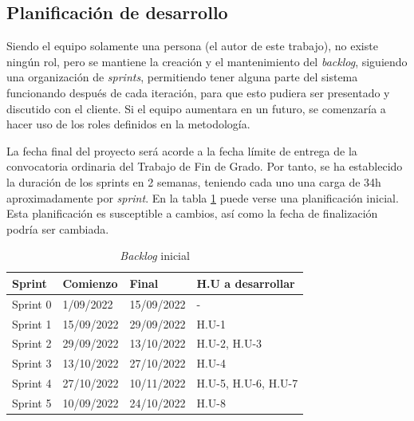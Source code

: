 \subsection{Planificación de desarrollo}
Siendo el equipo solamente una persona (el autor de este trabajo), no existe ningún rol, pero se mantiene la creación y el mantenimiento del \textit{backlog}, siguiendo una organización de \textit{sprints}, permitiendo tener alguna parte del sistema funcionando después de cada iteración, para que esto pudiera ser presentado y discutido con el cliente. Si el equipo aumentara en un futuro, se comenzaría a hacer uso de los roles definidos en la metodología.

La fecha final del proyecto será acorde a la fecha límite de entrega de la convocatoria ordinaria del Trabajo de Fin de Grado. Por tanto, se ha establecido la duración de los sprints en 2 semanas, teniendo cada uno una carga de 34h aproximadamente por \textit{sprint}. En la tabla \ref{tab:sprints} puede verse una planificación inicial. Esta planificación es susceptible a cambios, así como la fecha de finalización podría ser cambiada.


\begin{table}[!h]
	\begin{center}
		\begin{tabular}{|p{2cm}|p{3cm}|p{3cm}|p{3.8cm}|}
		\hline \textbf{Sprint} & \textbf{Comienzo} & \textbf{Final} & \textbf{H.U a desarrollar} \\ 
		\hline Sprint 0 & 1/09/2022  & 15/09/2022 & -\\ 
		\hline Sprint 1 & 15/09/2022 & 29/09/2022 & H.U-1\\ 
		\hline Sprint 2 & 29/09/2022 & 13/10/2022 & H.U-2, H.U-3\\ 
		\hline Sprint 3 & 13/10/2022 & 27/10/2022 & H.U-4\\ 
		\hline Sprint 4 & 27/10/2022 & 10/11/2022 & H.U-5, H.U-6, H.U-7\\ 
		\hline Sprint 5 & 10/09/2022 & 24/10/2022 & H.U-8\\ 
		\hline 
		\end{tabular}
		\caption{\textit{Backlog} inicial}
		\label{tab:sprints}
	\end{center}
\end{table}

